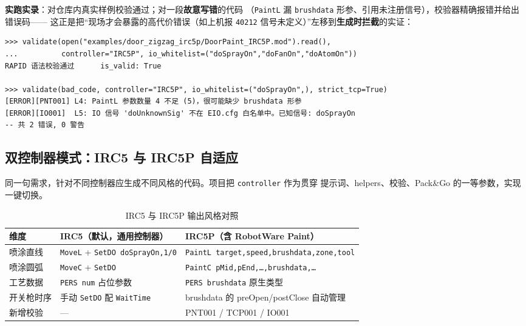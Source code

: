 \documentclass[12pt,a4paper,fontset=none]{ctexart}
\begin{document}
\noindent\textbf{实跑实录}：对仓库内真实样例校验通过；对一段\textbf{故意写错}的代码
（\texttt{PaintL} 漏 \texttt{brushdata} 形参、引用未注册信号），校验器精确报错并给出错误码——
这正是把“现场才会暴露的高代价错误（如上机报 \texttt{40212} 信号未定义）”左移到\textbf{生成时拦截}的实证：
\begin{lstlisting}[style=console]
>>> validate(open("examples/door_zigzag_irc5p/DoorPaint_IRC5P.mod").read(),
...          controller="IRC5P", io_whitelist=("doSprayOn","doFanOn","doAtomOn"))
RAPID 语法校验通过      is_valid: True

>>> validate(bad_code, controller="IRC5P", io_whitelist=("doSprayOn",), strict_tcp=True)
[ERROR][PNT001] L4: PaintL 参数数量 4 不足 (5)，很可能缺少 brushdata 形参
[ERROR][IO001]  L5: IO 信号 'doUnknownSig' 不在 EIO.cfg 白名单中。已知信号: doSprayOn
-- 共 2 错误, 0 警告
\end{lstlisting}

\subsection{双控制器模式：IRC5 与 IRC5P 自适应}
同一句需求，针对不同控制器应生成不同风格的代码。项目把 \texttt{controller} 作为贯穿
提示词、helpers、校验、Pack\&Go 的一等参数，实现一键切换。

\begin{table}[h]
\centering
\caption{IRC5 与 IRC5P 输出风格对照}
\small
\begin{tabularx}{\textwidth}{@{}l X X@{}}
\toprule
\textbf{维度} & \textbf{IRC5（默认，通用控制器）} & \textbf{IRC5P（含 RobotWare Paint）} \\
\midrule
喷涂直线 & \texttt{MoveL} + \texttt{SetDO doSprayOn,1/0} & \texttt{PaintL target,speed,brushdata,zone,tool} \\
喷涂圆弧 & \texttt{MoveC} + \texttt{SetDO} & \texttt{PaintC pMid,pEnd,…,brushdata,…} \\
工艺数据 & \texttt{PERS num} 占位参数 & \texttt{PERS brushdata} 原生类型 \\
开关枪时序 & 手动 \texttt{SetDO} 配 \texttt{WaitTime} & brushdata 的 preOpen/postClose 自动管理 \\
新增校验 & — & PNT001 / TCP001 / IO001 \\
\bottomrule
\end{tabularx}
\end{table}
\end{document}
